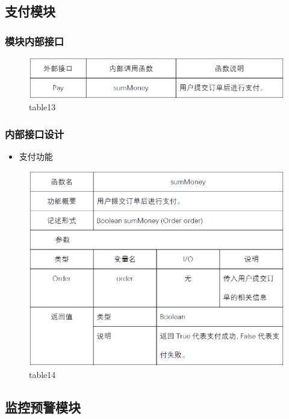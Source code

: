 \subsection{支付模块}
\subsubsection{模块内部接口}
\begin{figure}[!htbp]
	\centering
	\includegraphics[scale=0.7]{image/b13.png} %
	\caption{table13} %
\end{figure}
\subsubsection{内部接口设计}
\begin{itemize}
	\item 支付功能
\end{itemize}
\begin{figure}[!htbp]
	\centering
	\includegraphics[scale=0.7]{image/b14.png} %
	\caption{table14} %
\end{figure}
\subsection{监控预警模块}
